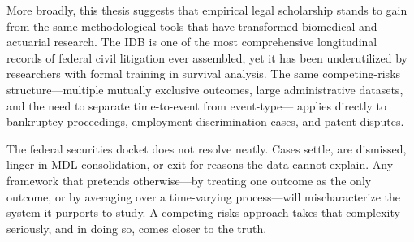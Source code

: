 More broadly, this thesis suggests that empirical legal
scholarship stands to gain from the same methodological tools
that have transformed biomedical and actuarial research. The
IDB is one of the most comprehensive longitudinal records of
federal civil litigation ever assembled, yet it has been
underutilized by researchers with formal training in survival
analysis. The same competing-risks structure---multiple
mutually exclusive outcomes, large administrative datasets,
and the need to separate time-to-event from event-type---
applies directly to bankruptcy proceedings, employment
discrimination cases, and patent disputes.

The federal securities docket does not resolve neatly. Cases
settle, are dismissed, linger in MDL consolidation, or exit
for reasons the data cannot explain. Any framework that
pretends otherwise---by treating one outcome as the only
outcome, or by averaging over a time-varying process---will
mischaracterize the system it purports to study. A
competing-risks approach takes that complexity seriously, and
in doing so, comes closer to the truth.

